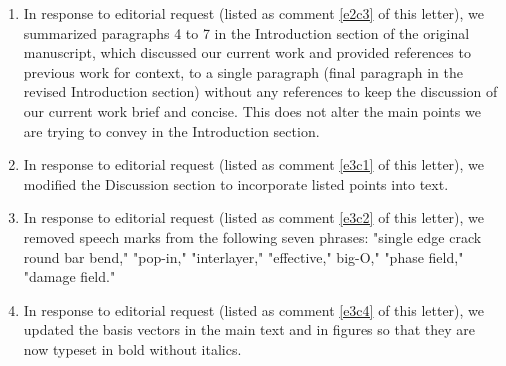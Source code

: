 \documentclass[11pt,letterpaper]{report}
\begin{document}
\begin{enumerate}[label=\textit{Ec.\arabic*}]
\item \label{MainText4} In response to editorial request (listed as comment \ref{e2c3} of this letter),  we summarized paragraphs 4 to 7 in the Introduction section of the original manuscript, which discussed our current work and provided references to previous work for context, to a single paragraph (final paragraph in the revised Introduction section) without any references to keep the discussion of our current work brief and concise.  This does not alter the main points we are trying to convey in the Introduction section.



\item \label{Language1} In response to editorial request (listed as comment \ref{e3c1} of this letter), we modified the Discussion section to incorporate listed points into text.

\item \label{Language2} In response to editorial request (listed as comment \ref{e3c2} of this letter),  we removed speech marks from the following seven phrases: "single edge crack round bar bend," "pop-in," "interlayer," "effective," big-O," "phase field," "damage field."




\item \label{Language4} In response to editorial request (listed as comment \ref{e3c4} of this letter), we updated the basis vectors in the main text and in figures so that they are now typeset in bold without italics.


\end{enumerate}
\end{document}
